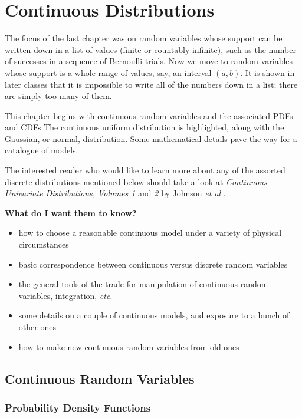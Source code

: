 \chapter{Continuous Distributions}
\label{sec-6}

\noindent
The focus of the last chapter was on random variables whose support
can be written down in a list of values (finite or countably
infinite), such as the number of successes in a sequence of Bernoulli
trials. Now we move to random variables whose support is a whole range
of values, say, an interval \((a,b)\). It is shown in later classes
that it is impossible to write all of the numbers down in a list;
there are simply too many of them.

This chapter begins with continuous random variables and the
associated PDFs and CDFs The continuous uniform distribution is
highlighted, along with the Gaussian, or normal, distribution. Some
mathematical details pave the way for a catalogue of models.

The interested reader who would like to learn more about any of the
assorted discrete distributions mentioned below should take a look at
\emph{Continuous Univariate Distributions, Volumes 1} and \emph{2} by Johnson
\emph{et al} \cite{Johnson1994,Johnson1995}.

\textbf{What do I want them to know?}
\begin{itemize}
\item how to choose a reasonable continuous model under a variety of
physical circumstances
\item basic correspondence between continuous versus discrete random
variables
\item the general tools of the trade for manipulation of continuous random
variables, integration, \emph{etc}.
\item some details on a couple of continuous models, and exposure to a
bunch of other ones
\item how to make new continuous random variables from old ones
\end{itemize}

\section{Continuous Random Variables}
\label{sec-6-1}

\subsection{Probability Density Functions}
\label{sec-6-1-1}

